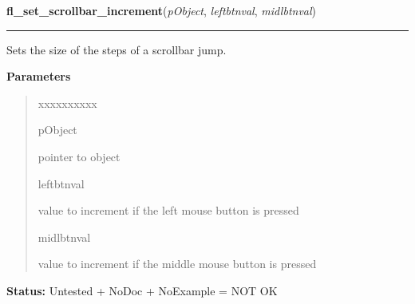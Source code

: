     \label{xformslib:library:fl_set_scrollbar_increment}

    \vspace{0.5ex}

\hspace{.8\funcindent}\begin{boxedminipage}{\funcwidth}

    \raggedright \textbf{fl\_set\_scrollbar\_increment}(\textit{pObject}, \textit{leftbtnval}, \textit{midlbtnval})

    \vspace{-1.5ex}

    \rule{\textwidth}{0.5\fboxrule}
\setlength{\parskip}{2ex}
    Sets the size of the steps of a scrollbar jump.

\setlength{\parskip}{1ex}
      \textbf{Parameters}
      \vspace{-1ex}

      \begin{quote}
        \begin{Ventry}{xxxxxxxxxx}

          \item[pObject]

          pointer to object

          \item[leftbtnval]

          value to increment if the left mouse button is pressed

          \item[midlbtnval]

          value to increment if the middle mouse button is pressed

        \end{Ventry}

      \end{quote}

\textbf{Status:} Untested + NoDoc + NoExample = NOT OK



    \end{boxedminipage}

    \label{xformslib:library:fl_get_scrollbar_increment}

    \vspace{0.5ex}


